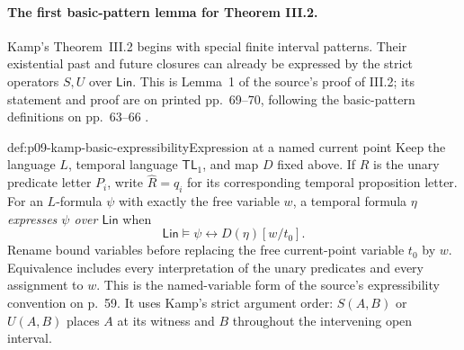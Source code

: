 
\paragraph{The first basic-pattern lemma for Theorem III.2.}
Kamp's Theorem~III.2 begins with special finite interval patterns.  Their
existential past and future closures can already be expressed by the
strict operators \(S,U\) over \(\mathsf{Lin}\).  This is Lemma~1 of the
source's proof of III.2; its statement and proof are on printed
pp.~69--70, following the basic-pattern definitions on pp.~63--66
\cite[ch.~III, pp.~60--70]{Kamp1968}.

\begin{hbdefinition}{def:p09-kamp-basic-expressibility}{Expression at a named current point}
Keep the language \(L\), temporal language \(\mathsf{TL}_1\), and map
\(D\) fixed above.  If \(R\) is the unary predicate letter \(P_i\),
write \(\widehat R=q_i\) for its corresponding temporal proposition
letter.  For an \(L\)-formula \(\psi\) with exactly the free variable
\(w\), a temporal formula \(\eta\) \emph{expresses \(\psi\) over
\(\mathsf{Lin}\)} when
\[
 \mathsf{Lin}\models
 \psi\longleftrightarrow D(\eta)[w/t_0].
\]
Rename bound variables before replacing the free current-point variable
\(t_0\) by \(w\).  Equivalence includes every interpretation of the
unary predicates and every assignment to \(w\).  This is the
named-variable form of the source's expressibility convention on p.~59.
It uses Kamp's strict argument order: \(S(A,B)\) or \(U(A,B)\) places
\(A\) at its witness and \(B\) throughout the intervening open interval.
\end{hbdefinition}

